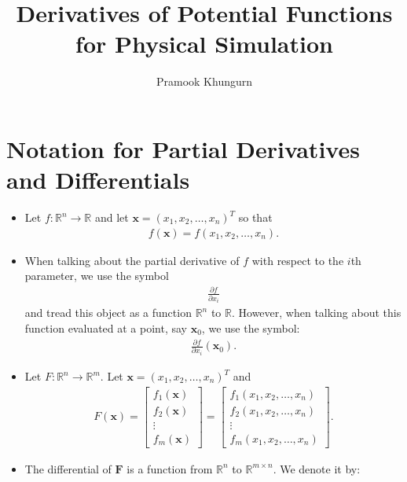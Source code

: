 \documentclass[10pt]{article}
\title{Derivatives of Potential Functions for Physical Simulation}
\author{Pramook Khungurn}
\newcommand{\ve}[1]{\mathbf{#1}}
\newcommand{\ra}{\rightarrow}
\newcommand{\Real}{\mathbb{R}}
\begin{document}
	\maketitle

  \section{Notation for Partial Derivatives and Differentials}
  \begin{itemize}
    \item Let $f : \Real^n \ra \Real$ and let $\ve{x} = (x_1, x_2, \dotsc, x_n)^T$ so that
    \begin{align*}
      f(\ve{x}) = f(x_1, x_2, \dotsc, x_n).
    \end{align*}

    \item When talking about the partial derivative of $f$ with respect to the $i$th parameter, we use the symbol
    \begin{align*}
      \frac{\partial f}{\partial x_i}
    \end{align*}
    and tread this object as a function $\Real^n$ to $\Real$. However, when talking about this function evaluated at a point, say $\ve{x}_0$, we use the symbol:
    \begin{align*}
      \frac{\partial f}{\partial x_i}(\ve{x}_0).
    \end{align*}
    \item Let $F : \Real^n \ra \Real^m$. Let $\ve{x} = (x_1, x_2, \dotsc, x_n)^T$ and
    \begin{align*}
      F(\ve{x}) 
      = \begin{bmatrix}
        f_1(\ve{x})\\
        f_2(\ve{x})\\
        \vdots\\
        f_m(\ve{x})
      \end{bmatrix}
      = \begin{bmatrix}
        f_1(x_1, x_2, \dotsc, x_n)\\
        f_2(x_1, x_2, \dotsc, x_n)\\
        \vdots\\
        f_m(x_1, x_2, \dotsc, x_n)
      \end{bmatrix}.
    \end{align*}
    \item The differential of $\ve{F}$ is a function from $\Real^n$ to $\Real^{m\times n}$. We denote it by:
    \begin{align*}

\end{align*}
\end{itemize}
\end{document}
